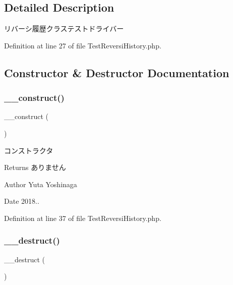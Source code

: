 \subsection{Detailed Description}
リバーシ履歴クラステストドライバー 

Definition at line 27 of file Test\+Reversi\+History.\+php.



\subsection{Constructor \& Destructor Documentation}
\mbox{\label{class_test_reversi_history_a095c5d389db211932136b53f25f39685}} 
\subsubsection{\texorpdfstring{\+\_\+\+\_\+construct()}{\_\_construct()}}
{\footnotesize\ttfamily \+\_\+\+\_\+construct (\begin{DoxyParamCaption}{ }\end{DoxyParamCaption})}



コンストラクタ 

\begin{DoxyReturn}{Returns}
ありません 
\end{DoxyReturn}
\begin{DoxyAuthor}{Author}
Yuta Yoshinaga 
\end{DoxyAuthor}
\begin{DoxyDate}{Date}
2018.. 
\end{DoxyDate}


Definition at line 37 of file Test\+Reversi\+History.\+php.

\mbox{\label{class_test_reversi_history_a421831a265621325e1fdd19aace0c758}} 
\subsubsection{\texorpdfstring{\+\_\+\+\_\+destruct()}{\_\_destruct()}}
{\footnotesize\ttfamily \+\_\+\+\_\+destruct (\begin{DoxyParamCaption}{ }\end{DoxyParamCaption})}



